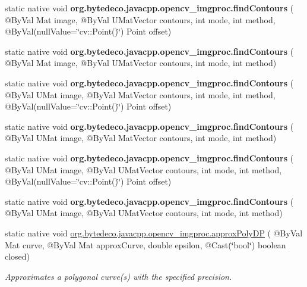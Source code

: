 \begin{DoxyCompactItemize}
static native void {\bfseries org.\+bytedeco.\+javacpp.\+opencv\+\_\+imgproc.\+find\+Contours} ( @By\+Val Mat image, @By\+Val U\+Mat\+Vector contours, int mode, int method, @By\+Val(null\+Value=\char`\"{}cv\+::\+Point()\char`\"{}) Point offset)
\item 
\mbox{\label{group__imgproc__shape_ga7e50eb8f5267eacbdc6b9b222c7934fc}} 
static native void {\bfseries org.\+bytedeco.\+javacpp.\+opencv\+\_\+imgproc.\+find\+Contours} ( @By\+Val Mat image, @By\+Val U\+Mat\+Vector contours, int mode, int method)
\item 
\mbox{\label{group__imgproc__shape_ga6cfd4f0c2df93afd8eeb329c719ac9fd}} 
static native void {\bfseries org.\+bytedeco.\+javacpp.\+opencv\+\_\+imgproc.\+find\+Contours} ( @By\+Val U\+Mat image, @By\+Val Mat\+Vector contours, int mode, int method, @By\+Val(null\+Value=\char`\"{}cv\+::\+Point()\char`\"{}) Point offset)
\item 
\mbox{\label{group__imgproc__shape_ga8ea1fd66bd5d44f0f7fe9df754847086}} 
static native void {\bfseries org.\+bytedeco.\+javacpp.\+opencv\+\_\+imgproc.\+find\+Contours} ( @By\+Val U\+Mat image, @By\+Val Mat\+Vector contours, int mode, int method)
\item 
\mbox{\label{group__imgproc__shape_ga9b9d5914bec73025c51f73c6e1f189dc}} 
static native void {\bfseries org.\+bytedeco.\+javacpp.\+opencv\+\_\+imgproc.\+find\+Contours} ( @By\+Val U\+Mat image, @By\+Val U\+Mat\+Vector contours, int mode, int method, @By\+Val(null\+Value=\char`\"{}cv\+::\+Point()\char`\"{}) Point offset)
\item 
\mbox{\label{group__imgproc__shape_ga4c289193c5c5377d64ceb90e41ee5e78}} 
static native void {\bfseries org.\+bytedeco.\+javacpp.\+opencv\+\_\+imgproc.\+find\+Contours} ( @By\+Val U\+Mat image, @By\+Val U\+Mat\+Vector contours, int mode, int method)
\item 
static native void \hyperlink{group__imgproc__shape_ga59b2a13c4f741e0898f8415d9436d8a0}{org.\+bytedeco.\+javacpp.\+opencv\+\_\+imgproc.\+approx\+Poly\+DP} ( @By\+Val Mat curve, @By\+Val Mat approx\+Curve, double epsilon, @Cast(\char`\"{}bool\char`\"{}) boolean closed)
\begin{DoxyCompactList}\small\item\em Approximates a polygonal curve(s) with the specified precision. \end{DoxyCompactList}\item 

\end{DoxyCompactItemize}
